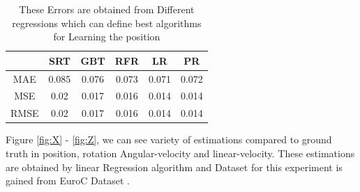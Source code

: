 \documentclass[a4paper,twoside]{article}
\begin{document}
\begin{table}[h]


\caption{These Errors are obtained from Different regressions which can define best algorithms for Learning the position}
\label{Error_table}
\begin{center}
\begin{small}


\begin{tabular}{|c||c||c||c||c||c|}
\hline
& SRT & GBT & RFR & LR & PR\\
\hline
\hline
MAE  & 0.085 & 0.076 & 0.073 & 0.071 & 0.072 \\
\hline

MSE  & 0.02 & 0.017 & 0.016 & 0.014 & 0.014 \\

\hline
RMSE  & 0.02 & 0.017 & 0.016 & 0.014 & 0.014 \\
\hline


\end{tabular}

\end{small}
\end{center}

\end{table}




   

Figure \ref{fig:X} - \ref{fig:Z},  we can see variety of estimations compared to ground truth in position, rotation Angular-velocity and linear-velocity. These estimations are obtained by linear Regression algorithm and Dataset for this experiment is gained from EuroC Dataset \cite{euroc}. 
\end{document}
